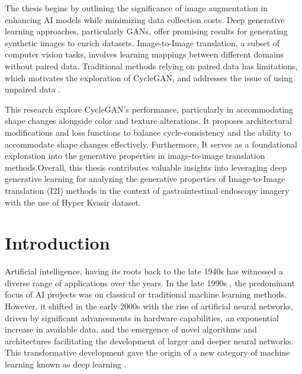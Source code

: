 \documentclass[UKenglish,12pt]{master-style}
\begin{document}
The thesis begins by outlining the significance of image augmentation in enhancing AI models while minimizing data collection costs. Deep generative learning approaches, particularly GANs, offer promising results for generating synthetic images to enrich datasets. Image-to-Image translation, a subset of computer vision tasks, involves learning mappings between different domains without paired data. Traditional methods relying on paired data has limitations, which motivates the exploration of CycleGAN, and addresses the issue of using unpaired data \cite{10.1007/978-3-031-45673-2}.

This research explore CycleGAN's performance, particularly in accommodating shape changes alongside color and texture alterations. It proposes architectural modifications and loss functions to balance cycle-consistency and the ability to accommodate shape changes effectively. Furthermore, It serves as a foundational exploration into the generative properties in image-to-image translation methods.Overall, this thesis contributes valuable insights into leveraging deep generative learning for analyzing the generative properties of Image-to-Image translation (I2I) methods in the context of gastrointestinal endoscopy imagery with the use of Hyper Kvasir dataset. 






\tableofcontents

\mainmatter
\chapter{Introduction}

Artificial intelligence, having its roots back to the late 1940s has witnessed a diverse range of applications over the years. In the late 1990s \cite{SHAO2022118221}, the predominant focus of AI projects was on classical or traditional machine learning methods. However, it shifted in the early 2000s with the rise of artificial neural networks, driven by significant advancements in hardware capabilities, an exponential increase in available data, and the emergence of novel algorithms and architectures facilitating the development of larger and deeper neural networks. This transformative development gave the origin of a new category of machine learning known as deep learning .
\end{document}
